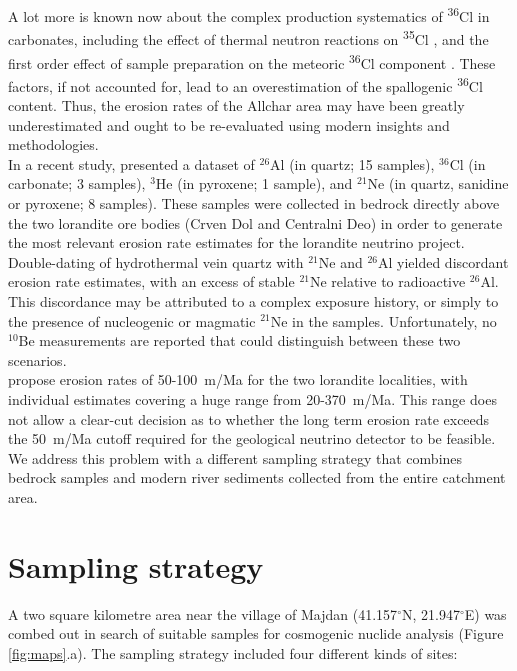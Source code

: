 \documentclass[titlepage]{article}
\begin{document}
A lot more is known now about the complex production systematics of
\textsuperscript{36}Cl in carbonates, including the effect of thermal
neutron reactions on \textsuperscript{35}Cl
\citep{bierman1995,stone1998,alfimov2009,schimmelpfennig2009}, and the
first order effect of sample preparation on the meteoric
\textsuperscript{36}Cl component \citep{merchel2008}. These factors,
if not accounted for, lead to an overestimation of the spallogenic
\textsuperscript{36}Cl content. Thus, the erosion rates of the Allchar
area may have been greatly underestimated and ought to be re-evaluated
using modern insights and methodologies.\\

In a recent study, \citet{pavicevic2016} presented a dataset of
$^{26}$Al (in quartz; 15 samples), $^{36}$Cl (in carbonate; 3
samples), $^{3}$He (in pyroxene; 1 sample), and $^{21}$Ne (in quartz,
sanidine or pyroxene; 8 samples).  These samples were collected in
bedrock directly above the two lorandite ore bodies (Crven Dol and
Centralni Deo) in order to generate the most relevant erosion rate
estimates for the lorandite neutrino project. Double-dating of
hydrothermal vein quartz with $^{21}$Ne and $^{26}$Al yielded
discordant erosion rate estimates, with an excess of stable $^{21}$Ne
relative to radioactive $^{26}$Al. This discordance may be attributed
to a complex exposure history, or simply to the presence of
nucleogenic or magmatic $^{21}$Ne in the samples. Unfortunately, no
$^{10}$Be measurements are reported that could distinguish between
these two scenarios.\\

\citet{pavicevic2016} propose erosion rates of 50-100~m/Ma for the two
lorandite localities, with individual estimates covering a huge range
from 20-370~m/Ma. This range does not allow a clear-cut decision as to
whether the long term erosion rate exceeds the 50~m/Ma cutoff required
for the geological neutrino detector to be feasible. We address this
problem with a different sampling strategy that combines bedrock
samples and modern river sediments collected from the entire catchment
area.

\section{Sampling strategy}
\label{sec:strategy}

A two square kilometre area near the village of Majdan
(41.157$^{\circ}$N, 21.947$^{\circ}$E) was combed out in search of
suitable samples for cosmogenic nuclide analysis (Figure
\ref{fig:maps}.a). The sampling strategy included four different kinds
of sites:
\end{document}
